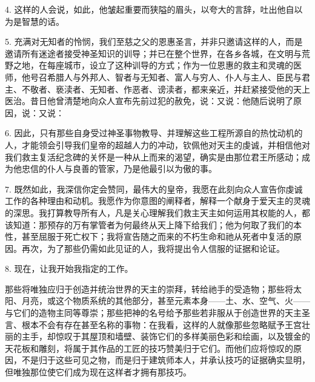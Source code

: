 4. 这样的人会说，如此，他皱起重要而狭隘的眉头，以夸大的言辞，吐出他自以为是智慧的话。\par

5. 充满对无知者的怜悯，我们至慈之父的恩惠圣言，并非只邀请这样的人，而是邀请所有迷途者接受神圣知识的训导；并已在整个世界，在各乡各城，在文明与荒野之地，在每座城市，设立了这种训导的方式；作为一位恩惠的救主和灵魂的医师，他号召希腊人与外邦人、智者与无知者、富人与穷人、仆人与主人、臣民与君主、不敬者、亵渎者、无知者、作恶者、谤渎者，都来亲近，并赶紧接受他的天上医治。昔日他曾清楚地向众人宣布先前过犯的赦免，说：又说：他随后说明了原因，说：又说：\par

6. 因此，只有那些自身受过神圣事物教导、并理解这些工程所源自的热忱动机的人，才能领会引导我们皇帝的超越人力的冲动，钦佩他对天主的虔诚，并相信他对我们救主复活纪念碑的关怀是一种从上而来的渴望，确实是由那位君王所感动；成为他忠信的仆人与良善的管家，乃是他最引以为傲的事。\par

7. 既然如此，我深信你定会赞同，最伟大的皇帝，我愿在此刻向众人宣告你虔诚工作的各种理由和动机。我愿作为你意图的阐释者，解释一个献身于爱天主的灵魂的深思。我打算教导所有人，凡是关心理解我们救主天主如何运用其权能的人，都该知道：那预存的万有掌管者为何最终从天上降下给我们；他为何取了我们的本性，甚至屈服于死亡权下；我将宣告随之而来的不朽生命和祂从死者中复活的原因。再次，为了那些仍需如此见证的人，我将提出令人信服的证据和论证。\par

8. 现在，让我开始我指定的工作。\par

那些将唯独应归于创造并统治世界的天主的崇拜，转给祂手的受造物；那些将太阳、月亮，或这个物质系统的其他部分，甚至元素本身——土、水、空气、火——与它们的造物主同等尊崇；那些把神的名号给予那些若非服从于创造世界的天主圣言、根本不会有存在甚至名称的事物：在我看，这样的人就像那些忽略赋予王宫壮丽的主手，却惊叹于其屋顶和墙壁、装饰它们的多样美丽色彩和绘画，以及镀金的天花板和雕刻，将属于其作品的工匠的技巧赞美归于它们。而他们应将惊叹的原因，不是归于这些可见之物，而是归于建筑师本人，并承认技巧的证据确实显明，但唯独那位使它们成为现在这样者才拥有那技巧。\par

